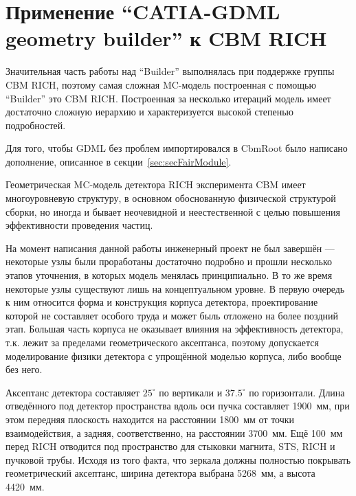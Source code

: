 \chapter{Применение ``CATIA-GDML geometry builder'' к CBM RICH}\label{sec:chapRICHgeo}

Значительная часть работы над ``Builder'' выполнялась при поддержке группы CBM RICH, поэтому самая сложная MC-модель построенная с помощью ``Builder'' это CBM RICH. Построенная за несколько итераций модель имеет достаточно сложную иерархию и характеризуется высокой степенью подробностей.

Для того, чтобы GDML без проблем импортировался в CbmRoot было написано дополнение, описанное в секции~\ref{sec:secFairModule}.

Геометрическая MC-модель детектора RICH эксперимента CBM имеет многоуровневую структуру, в основном обоснованную физической структурой сборки, но иногда и \todo бывает неочевидной и неестественной с целью повышения эффективности проведения частиц.

На момент написания данной работы инженерный проект не был завершён --- некоторые узлы были проработаны достаточно подробно и прошли несколько этапов уточнения, в которых модель менялась принципиально. В то же время некоторые узлы существуют лишь на концептуальном уровне. В первую очередь к ним относится форма и конструкция корпуса детектора, проектирование которой не составляет особого труда и может быль отложено на более поздний этап. Большая часть корпуса не оказывает влияния на эффективность детектора, т.к. лежит за пределами геометрического аксептанса, поэтому допускается моделирование физики детектора с упрощённой моделью корпуса, либо вообще без него.

Аксептанс детектора составляет $25^\circ$ по вертикали и $37.5^\circ$ по горизонтали. Длина отведённого под детектор пространства вдоль оси пучка составляет 1900~мм, при этом передняя плоскость находится на расстоянии 1800~мм от точки взаимодействия, а задняя, соответственно, на расстоянии 3700~мм. Ещё 100~мм перед RICH отводится под пространство для стыковки магнита, STS, RICH и пучковой трубы. Исходя из того факта, что зеркала должны полностью покрывать геометрический аксептанс, ширина детектора выбрана 5268~мм, а высота 4420~мм.

